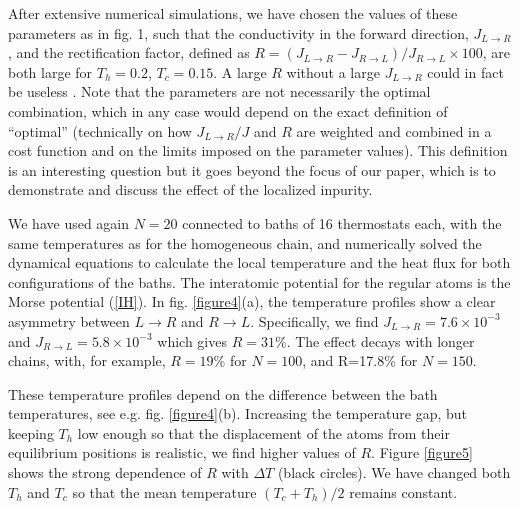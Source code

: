 After extensive numerical simulations, we have chosen the values of these parameters as in fig. 1, such that the conductivity in the forward direction, $J_{L\rightarrow R}$, and the rectification factor, defined as $R=(J_{L\rightarrow R}-J_{R\rightarrow L}) / J_{R\rightarrow L}\times 100$,
are both large for $T_h=0.2$, $T_c=0.15$. A large $R$ without a large $J_{L\rightarrow R}$ could in fact be useless \cite{Roberts2011}.
Note that the parameters are not necessarily the optimal combination, which in any case would depend on the exact definition of ``optimal'' (technically on how $J_{L\rightarrow R}/J$ and $R$ are weighted and combined in a cost function and on the limits imposed on the
parameter values). This definition is an interesting question but it goes beyond the focus of our paper,
which is to demonstrate and discuss the effect of the localized inpurity.

We have used again $N=20$ connected to baths of 16 thermostats each, with the same temperatures as for the homogeneous chain, and numerically solved the dynamical equations
to calculate the local temperature and the heat flux for both configurations of the baths. The interatomic potential for the regular atoms is the Morse potential (\ref{IH}).
In fig. \ref{figure4}(a), the temperature profiles show a clear asymmetry between ${L\rightarrow R}$ and ${R\rightarrow L}$. Specifically, we find $J_{L\rightarrow R}=7.6 \times 10^{-3}$ and $J_{R\rightarrow L}=5.8 \times 10^{-3}$ which gives
$R=31\%$. The effect decays with longer chains,  with, for example, $R=19\%$ for $N=100$, and R=17.8\% for $N=150$.

These temperature profiles depend on the difference between the bath temperatures, see e.g. fig. \ref{figure4}(b). Increasing the temperature gap, but  keeping $T_h$ low enough so that the displacement of the atoms from their equilibrium positions is realistic, we find higher values of $R$. Figure \ref {figure5} shows the strong dependence of $R$ with $\Delta T$ (black circles).
We have changed both $T_h$ and $T_c$ so that the mean temperature $(T_c+T_h)/2$ remains constant.





